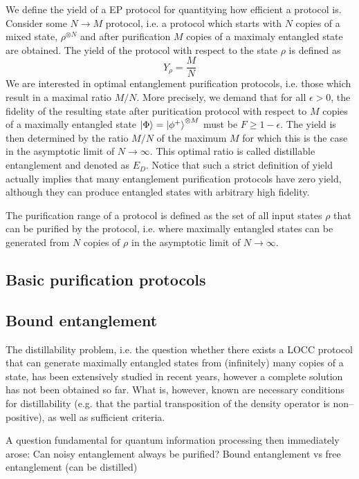 \documentclass[10pt,a4paper]{book}
\numberwithin{equation}{chapter}
\numberwithin{figure}{chapter}
\numberwithin{table}{chapter}
\begin{document}
We define the yield of a EP protocol for quantitying how efficient a protocol is. Consider some $N\rightarrow M$ protocol, i.e. a protocol which starts with $N$ copies of a mixed state, $\rho^{\otimes N}$ and after purification $M$ copies of a maximaly entangled state are obtained. The yield of the protocol with respect to the state $\rho$ is defined as
\begin{equation}
Y_\rho = \frac{M}{N}
\end{equation}
We are interested in optimal entanglement purification protocols, i.e. those which result in a maximal ratio $M/N$. More precisely, we demand that for all $\epsilon > 0$, the fidelity of the resulting state after puritication protocol with respect to $M$ copies of a maximally entangled state $\ket{\Phi}=\ket{\phi^+}^{\otimes M}$ must be $F \geq 1-\epsilon$. The yield is then determined by the ratio $M/N$ of the maximum $M$ for which this is the case in the asymptotic limit of $N \rightarrow \infty$. This optimal ratio is called distillable entanglement and denoted as $E_D$.
Notice that such a strict definition of yield actually implies that many entanglement purification protocols have zero yield, although they can produce entangled states with arbitrary high fidelity.

The purification range of a protocol is defined as the set of all input states $\rho$ that can be purified by the protocol, i.e. where maximally entangled states can be generated from $N$ copies of $\rho$ in the asymptotic limit of $N \rightarrow \infty$.
\subsection{Basic purification protocols}

\subsection{Bound entanglement}
The distillability problem, i.e. the question whether there exists a LOCC protocol that can generate maximally entangled states from (infinitely) many copies of a state, has been extensively studied in recent years, however a complete solution has not been obtained so far. What is, however, known are necessary conditions for distillability (e.g. that the partial transposition of the density operator is non–positive), as well as sufficient criteria.

A question fundamental for quantum information processing then immediately arose: Can noisy entanglement always be purified? Bound entanglement vs free entanglement (can be distilled)
\end{document}

